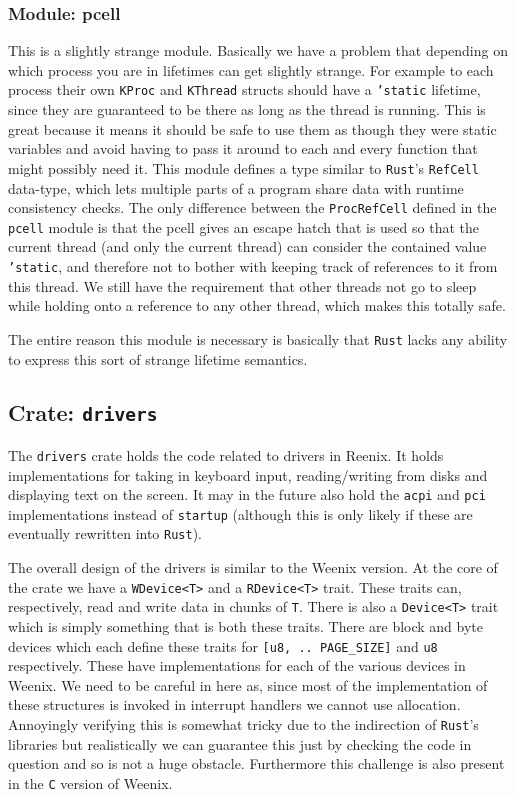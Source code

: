 \documentclass[12pt,letterpaper]{article}
\newcommand{\rust}{\texttt{Rust}}
\begin{document}
\subsubsection{Module: pcell}
This is a slightly strange module. Basically we have a problem that
depending on which process you are in lifetimes can get slightly
strange. For example to each process their own \texttt{KProc} and
\texttt{KThread} structs should have a \texttt{'static} lifetime, since
they are guaranteed to be there as long as the thread is running. This
is great because it means it should be safe to use them as though they
were static variables and avoid having to pass it around to each and
every function that might possibly need it. This module defines a type
similar to \rust{}'s \texttt{RefCell} data-type, which lets multiple
parts of a program share data with runtime consistency checks. The only
difference between the \texttt{ProcRefCell} defined in the \texttt{pcell}
module is that the pcell gives an escape hatch that is used so that the
current thread (and only the current thread) can consider the contained
value \texttt{'static}, and therefore not to bother with keeping track
of references to it from this thread. We still have the requirement
that other threads not go to sleep while holding onto a reference to
any other thread, which makes this totally safe.

The entire reason this module is necessary is basically that \rust{}
lacks any ability to express this sort of strange lifetime semantics.

\subsection{Crate: \texttt{drivers}}
The \texttt{drivers} crate holds the code related to drivers in Reenix. It
holds implementations for taking in keyboard input, reading/writing from disks
and displaying text on the screen. It may in the future also hold the
\texttt{acpi} and \texttt{pci} implementations instead of \texttt{startup}
(although this is only likely if these are eventually rewritten into \rust{}).

The overall design of the drivers is similar to the Weenix version. At the core
of the crate we have a \texttt{WDevice<T>} and a \texttt{RDevice<T>} trait.
These traits can, respectively, read and write data in chunks of \texttt{T}.
There is also a \texttt{Device<T>} trait which is simply something that is both
these traits.  There are block and byte devices which each define these traits
for \texttt{[u8, .. PAGE\_SIZE]} and \texttt{u8} respectively. These have
implementations for each of the various devices in Weenix. We need to be
careful in here as, since most of the implementation of these structures is
invoked in interrupt handlers we cannot use allocation.  Annoyingly verifying
this is somewhat tricky due to the indirection of \rust{}'s libraries but
realistically we can guarantee this just by checking the code in question and
so is not a huge obstacle. Furthermore this challenge is also present in the
\texttt{C} version of Weenix.
\end{document}
